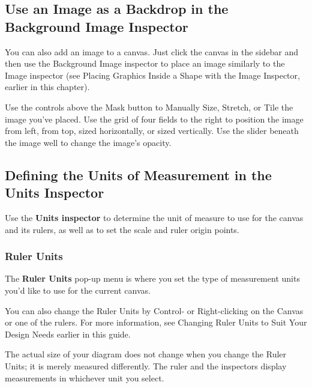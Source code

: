 \documentclass[../main.tex]{subfiles}
\begin{document}

\subsection{Use an Image as a Backdrop in the Background Image Inspector}

You can also add an image to a canvas. Just click the canvas in the sidebar and then use the
Background Image inspector to place an image similarly to the Image inspector (see Placing
Graphics Inside a Shape with the Image Inspector, earlier in this chapter).


Use the controls above the Mask button to Manually Size, Stretch, or Tile the image you've
placed. Use the grid of four fields to the right to position the image from left, from top,
sized horizontally, or sized vertically. Use the slider beneath the image well to change the
image's opacity.

\subsection{Defining the Units of Measurement in the Units Inspector}

Use the \textbf{Units inspector} to determine the unit of measure to use for the canvas and its
rulers, as well as to set the scale and ruler origin points.


\subsubsection{Ruler Units}

The \textbf{Ruler Units} pop-up menu is where you set the type of measurement units you'd like
to use for the current canvas.


\begin{ognote}
  You can also change the Ruler Units by Control- or Right-clicking on the Canvas or one of the
  rulers. For more information, see Changing Ruler Units to Suit Your Design Needs earlier in
  this guide.
\end{ognote}

The actual size of your diagram does not change when you change the Ruler Units; it is merely
measured differently. The ruler and the inspectors display measurements in whichever unit you
select.
\end{document}
